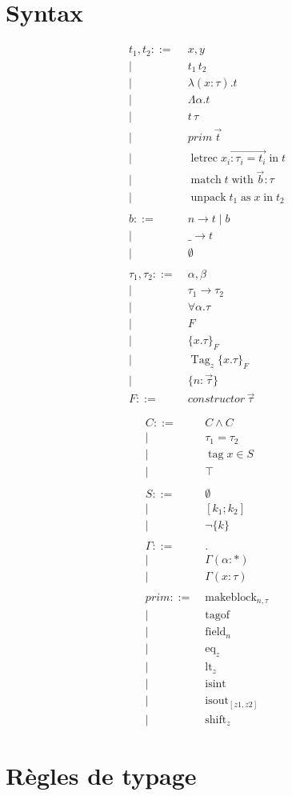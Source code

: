 \documentclass{article}
\newcommand\term{t}
\newcommand\ty{\tau}
\newcommand\tyenv{\Gamma}
\newcommand\var{x}
\newcommand\tyvar{\alpha}
\newcommand\binding[2]{(#1 : #2)}
\newcommand\kw[1]{\operatorname{#1}}
\newcommand\syn[1]{#1 ::=& \; }
\newcommand\synor{\\ |& \; }
\begin{document}
\newcommand\pator{\;|\;}

\section{Syntax}

\begin{multicols}{2}
\begin{align*}
  \syn{\term_1, \term_2} \var, y
  \synor      \term_1 \, \term_2
  \synor      \lambda \binding{\var}{\ty} . \term
  \synor      \Lambda \tyvar . \term
  \synor      \term \, \ty
  \synor      prim \, \vec{\term}
  \synor      \kw{letrec} \vec{\var_i : \ty_i = \term_i} \kw{in} \term
  \synor      \kw{match} \term \kw{with} \vec{b} : \ty
  \synor      \kw{unpack} \term_1 \kw{as} \var \kw{in} \term_2
%
  \\ \\
%
  \syn{b} n \rightarrow \term \; | \; b
  \synor  \_ \rightarrow \term
  \synor  \emptyset
%
  \\ \\
%
  \syn{\ty_1, \ty_2} \tyvar, \beta
  \synor  \ty_1 \rightarrow \ty_2
  \synor  \forall \tyvar. \ty
  \synor  F
  \synor  \{ \var . \ty \}_F
  \synor  \kw{Tag}_z \{ \var . \ty \}_F
  \synor  \{ n: \vec{\ty} \}
  \\
  \syn{F} constructor \, \vec{\ty}
\end{align*}
   
\begin{align*}
  \syn{C} C \wedge C
  \synor  \ty_1 = \ty_2
  \synor  \kw{tag} \var \in S
  \synor  \top
%
  \\ \\
%
  \syn{S} \emptyset
  \synor  [ k_1 ; k_2 ]
  \synor  \lnot \{ k \}
%
  \\ \\
%
  \syn{\tyenv} .
  \synor \tyenv \binding{\alpha}{*}
  \synor \tyenv \binding{\var}{\ty}
%
  \\ \\
%
  \syn{prim} \kw{makeblock}_{n,\ty}
  \synor \kw{tagof}
  \synor \kw{field}_{n}
  \synor \kw{eq}_{z}
  \synor \kw{lt}_{z}
  \synor \kw{isint}
  \synor \kw{isout}_{[z1,z2]}
  \synor \kw{shift}_{z}
\end{align*}
\end{multicols}

\section{Règles de typage}
\end{document}
